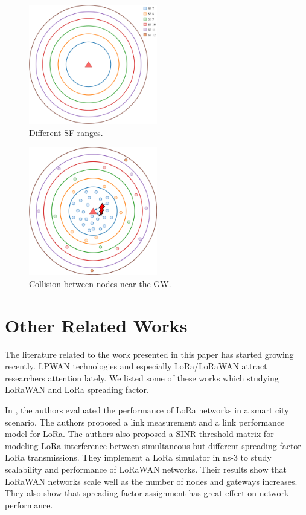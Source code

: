 \documentclass[conference]{IEEEtran}
\begin{document}
\begin{figure}
\centering
\includegraphics[width=0.5\textwidth]{lora0}
\caption{Different SF ranges.}
\label{fig:problem1}
\end{figure}

\begin{figure}
\centering
\includegraphics[width=0.5\textwidth]{lora1}
\caption{Collision between nodes near the GW.}
\label{fig:problem2}
\end{figure}


\section{Other Related Works}
The literature related to the work presented in this paper has started growing recently. LPWAN technologies and especially LoRa/LoRaWAN attract researchers attention lately. We listed some of these works which studying  LoRaWAN and LoRa spreading factor.

\par In \cite{7996384}, the authors evaluated the performance of LoRa networks in a smart city scenario. The
authors proposed a link measurement and a link performance model for LoRa. The authors also proposed a SINR threshold matrix for modeling LoRa interference between simultaneous but different spreading factor LoRa transmissions. They implement a LoRa simulator in ns-3 to study scalability and performance of LoRaWAN networks. Their results show that LoRaWAN networks scale well as the number of nodes and gateways increases. They also show that spreading factor assignment has great effect on network performance.
\end{document}
